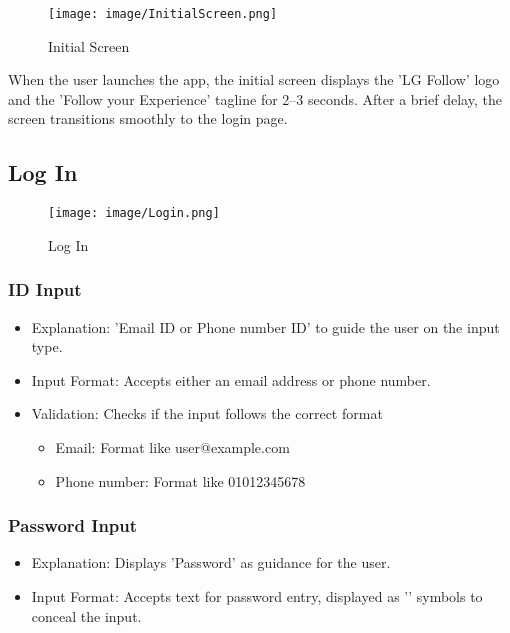 \documentclass[conference]{IEEEtran}
\begin{document}
\begin{figure}[h!]
    \centering
    \texttt{[image: image/InitialScreen.png]}
    \caption{Initial Screen}
    \label{fig:enter-label}
\end{figure}

\noindent When the user launches the app, the initial screen displays the 'LG Follow' logo and the 'Follow your Experience' tagline for 2–3 seconds. After a brief delay, the screen transitions smoothly to the login page.\\


\subsection{Log In}

\begin{figure}[h!]
    \centering
    \texttt{[image: image/Login.png]}
    \caption{Log In}
    \label{fig:enter-label}
\end{figure}

\subsubsection{ID Input}
\begin{itemize}
    \item Explanation: 'Email ID or Phone number ID' to guide the user on the input type.\\
    \item Input Format: Accepts either an email address or phone number.\\
    \item Validation: Checks if the input follows the correct format
\begin{itemize}
    \item Email: Format like user@example.com\\
    \item Phone number: Format like 01012345678\\
\end{itemize}
\end{itemize}

\subsubsection{Password Input}
\begin{itemize}
    \item Explanation: Displays 'Password' as guidance for the user.\\
    \item Input Format: Accepts text for password entry, displayed as '\textbullet' symbols to conceal the input.\\
\end{itemize}
\end{document}
